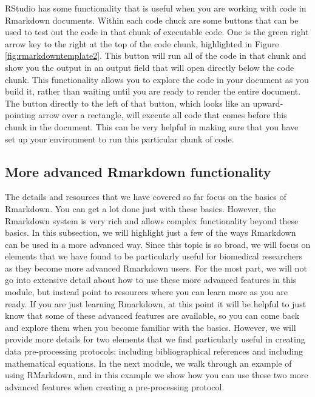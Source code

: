 \documentclass[]{tufte-book}
\begin{document}
RStudio has some functionality that is useful when you are working with code in
Rmarkdown documents. Within each code chuck are some buttons that can be used to
test out the code in that chunk of executable code. One is the green right arrow
key to the right at the top of the code chunk, highlighted in Figure
\ref{fig:rmarkdowntemplate2}. This button will run all of the code in that
chunk and show you the output in an output field that will open directly below
the code chunk. This functionality allows you to explore the code in your
document as you build it, rather than waiting until you are ready to render the
entire document. The button directly to the left of that button, which looks
like an upward-pointing arrow over a rectangle, will execute all code that comes
before this chunk in the document. This can be very helpful in making sure that
you have set up your environment to run this particular chunk of code.

\hypertarget{more-advanced-rmarkdown-functionality}{%
\subsection{More advanced Rmarkdown functionality}\label{more-advanced-rmarkdown-functionality}}

The details and resources that we have covered so far focus on the basics of
Rmarkdown. You can get a lot done just with these basics. However, the Rmarkdown
system is very rich and allows complex functionality beyond these basics. In
this subsection, we will highlight just a few of the ways Rmarkdown can be used
in a more advanced way. Since this topic is so broad, we will focus on elements
that we have found to be particularly useful for biomedical researchers as they
become more advanced Rmarkdown users. For the most part, we will not go into
extensive detail about how to use these more advanced features in this module,
but instead point to resources where you can learn more as you are ready. If you
are just learning Rmarkdown, at this point it will be helpful to just know that
some of these advanced features are available, so you can come back and explore
them when you become familiar with the basics. However, we will provide more
details for two elements that we find particularly useful in creating data
pre-processing protocols: including bibliographical references and including
mathematical equations. In the next module, we walk through an example of using
RMarkdown, and in this example we show how you can use these two more advanced
features when creating a pre-processing protocol.
\end{document}
